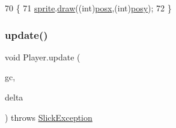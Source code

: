 \begin{DoxyCode}
70     \{
71         \mbox{\hyperlink{class_player_a500d31b34518044f505159570d00a774}{sprite}}.\mbox{\hyperlink{classorg_1_1newdawn_1_1slick_1_1_animation_a7ff3b50dcc4c72c83ada402daa6fe5f3}{draw}}((\textcolor{keywordtype}{int})\mbox{\hyperlink{class_player_a8c2978dfd4bab9a91bf1793b0edbe698}{posx}},(\textcolor{keywordtype}{int})\mbox{\hyperlink{class_player_afc459a9ddc8482a3905bf40e410084a8}{posy}});
72     \}
\end{DoxyCode}
\mbox{\label{class_player_a07bdda48d9f22aac28ddd4b5ffa2f20d}} 
\subsubsection{\texorpdfstring{update()}{update()}}
{\footnotesize\ttfamily void Player.\+update (\begin{DoxyParamCaption}\item[{\mbox{\hyperlink{classorg_1_1newdawn_1_1slick_1_1_game_container}{Game\+Container}}}]{gc,  }\item[{int}]{delta }\end{DoxyParamCaption}) throws \mbox{\hyperlink{classorg_1_1newdawn_1_1slick_1_1_slick_exception}{Slick\+Exception}}\hspace{0.3cm}{\ttfamily [inline]}}


